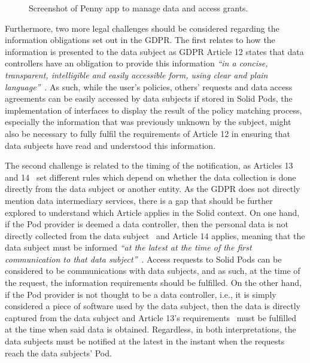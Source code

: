 \begin{figure}[htp]
    \centering
    \caption{Screenshot of Penny app to manage data and access grants.}
    \label{fig:penny}
\end{figure}

Furthermore, two more legal challenges should be considered regarding the information obligations set out in the GDPR.
The first relates to how the information is presented to the data subject as GDPR Article 12 states that data controllers have an obligation to provide this information \textit{``in a concise, transparent, intelligible and easily accessible form, using clear and plain language''}~\citeyearpar{noauthor_regulation_2016}.
As such, while the user's policies, others' requests and data access agreements can be easily accessed by data subjects if stored in Solid Pods, the implementation of interfaces to display the result of the policy matching process, especially the information that was previously unknown by the subject, might also be necessary to fully fulfil the requirements of Article 12 in ensuring that data subjects have read and understood this information.

The second challenge is related to the timing of the notification, as Articles 13 and 14~\citeyearpar{noauthor_regulation_2016} set different rules which depend on whether the data collection is done directly from the data subject or another entity.
As the GDPR does not directly mention data intermediary services, there is a gap that should be further explored to understand which Article applies in the Solid context.
On one hand, if the Pod provider is deemed a data controller, then the personal data is not directly collected from the data subject~\citep{pandit_making_2023} and Article 14 applies, meaning that the data subject must be informed \textit{``at the latest at the time of the first communication to that data subject''}~\citeyearpar{noauthor_regulation_2016}.
Access requests to Solid Pods can be considered to be communications with data subjects, and as such, at the time of the request, the information requirements should be fulfilled.
On the other hand, if the Pod provider is not thought to be a data controller, i.e., it is simply considered a piece of software used by the data subject, then the data is directly captured from the data subject and Article 13's requirements~\citeyearpar{noauthor_regulation_2016} must be fulfilled at the time when said data is obtained.
Regardless, in both interpretations, the data subjects must be notified at the latest in the instant when the requests reach the data subjects' Pod.

